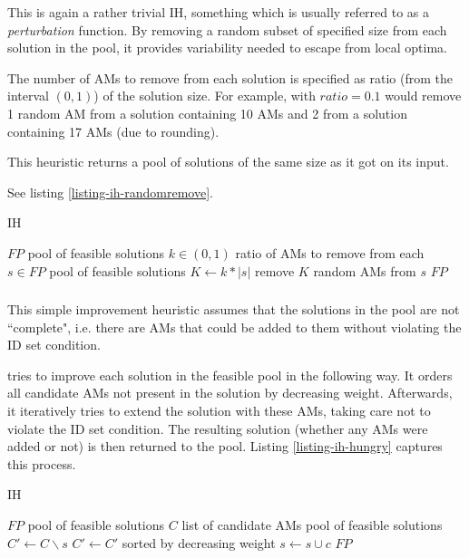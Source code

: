 This is again a rather trivial IH, something which is usually referred to as a \textit{perturbation} function. %
By removing a random subset of specified size from each solution in the pool, it provides variability needed to escape from local optima. %

The number of AMs to remove from each solution is specified as ratio (from the interval $(0, 1)$) of the solution size. %
For example,  with $ratio = 0.1$ would remove 1 random AM from a solution containing 10 AMs and 2 from a solution containing 17 AMs (due to rounding).

This heuristic returns a pool of solutions of the same size as it got on its input.

See listing \ref{listing-ih-randomremove}.

\begin{algorithm}
\caption{ IH}
\label{listing-ih-randomremove}
\begin{algorithmic}
\REQUIRE $FP$ pool of feasible solutions
\REQUIRE $k \in (0,1)$ ratio of AMs to remove from each $s \in FP$
\ENSURE pool of feasible solutions
  \STATE $K \gets k * |s|$
  \STATE remove $K$ random AMs from $s$
\ENDFOR
\RETURN $FP$
\end{algorithmic}
\end{algorithm}

\subsubsection{}

This simple improvement heuristic assumes that the solutions in the pool are not ``complete", i.e. there are AMs that could be added to them without violating the ID set condition.

 tries to improve each solution in the feasible pool in the following way. It orders all candidate AMs not present in the solution by decreasing weight. Afterwards, it iteratively tries to extend the solution with these AMs, taking care not to violate the ID set condition. The resulting solution (whether any AMs were added or not) is then returned to the pool. Listing \ref{listing-ih-hungry} captures this process.

\begin{algorithm}
\caption{ IH}
\label{listing-ih-hungry}
\begin{algorithmic}
\REQUIRE $FP$ pool of feasible solutions
\REQUIRE $C$ list of candidate AMs
\ENSURE pool of feasible solutions
  \STATE {}
  \STATE $C' \gets C \backslash s$
  \STATE $C' \gets C'$ sorted by decreasing weight
      \STATE $s \gets s \cup c$
    \ENDIF
  \ENDFOR
\ENDFOR
\RETURN $FP$
\end{algorithmic}
\end{algorithm}

